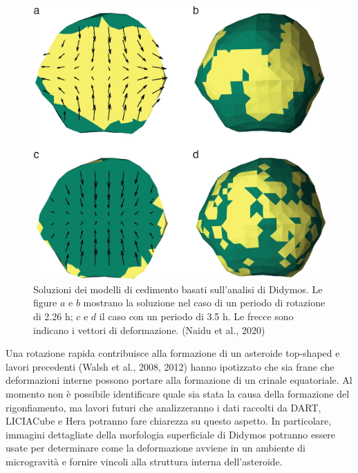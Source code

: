 \documentclass[a4paper,11pt,openright]{book}
\begin{document}
\begin{figure}
    \centering
    \includegraphics[scale=0.6]{figure/failure_models.jpg}
    \caption[Soluzioni dei modelli di cedimento basati sull'analisi di Didymos.]{Soluzioni dei modelli di cedimento basati sull'analisi di Didymos. Le figure $a$ e $b$ mostrano la soluzione nel caso di un periodo di rotazione di 2.26 h; $c$ e $d$ il caso con un periodo di 3.5 h. Le frecce sono indicano i vettori di deformazione. (Naidu et al., 2020)}
    \label{fig:failure_models}
\end{figure}

Una rotazione rapida contribuisce alla formazione di un asteroide top-shaped e lavori precedenti (Walsh et al., 2008, 2012) hanno ipotizzato che sia frane che deformazioni interne possono portare alla formazione di un crinale equatoriale. Al momento non è possibile identificare quale sia stata la causa della formazione del rigonfiamento, ma lavori futuri che analizzeranno i dati raccolti da DART, LICIACube e Hera potranno fare chiarezza su questo aspetto. In particolare, immagini dettagliate della morfologia superficiale di Didymos potranno essere usate per determinare come la deformazione avviene in un ambiente di microgravità e fornire vincoli alla struttura interna dell'asteroide.
\end{document}
